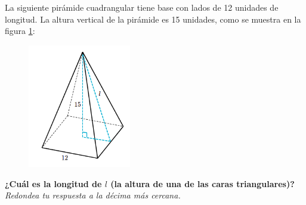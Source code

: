 \question[15]  La siguiente pirámide cuadrangular tiene base con lados de 12 unidades de longitud.
La altura vertical de la pirámide es 15 unidades, como se muestra en la figura \ref{fig:pitagoras3D_piram_03}:\\
\begin{figure}[H]
    \begin{center}
        \includegraphics[width=0.4\textwidth]{../images/pitagoras3D_piram_03.png}
    \end{center}
    \caption{}
    \label{fig:pitagoras3D_piram_03}
\end{figure}
\textbf{¿Cuál es la longitud de $l$ (la altura de una de las caras triangulares)?}\\
\textit{Redondea tu respuesta a la décima más cercana.}
